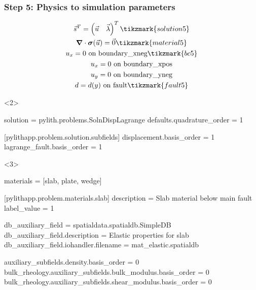 \documentclass[aspectratio=169]{beamer}
\begin{document}
\begin{frame}[t,fragile]
  \frametitle{Step 5: Physics to simulation parameters}
  \summary{}

  \begin{minipage}[t]{0.3\textwidth}
    {\scriptsize
    \begin{gather*}
    \vec{s}^T = \left( \vec{u} \quad \vec{\lambda} \right)^T \tikzmark{solution5}\\
    \tensor{\nabla} \cdot \tensor{\sigma}(\vec{u}) = \vec{0} \tikzmark{material5}\\
    u_x = 0 \text{ on boundary\_xneg} \tikzmark{bc5}\\
    u_x = 0 \text{ on boundary\_xpos} \\
    u_y = 0 \text{ on boundary\_yneg} \\
    d = d(y) \text{ on fault} \tikzmark{fault5}
    \end{gather*}}
  \end{minipage}
  \hfill
  \begin{minipage}[t]{0.67\textwidth}
    \begin{onlyenv}<2>
      \begin{cfgcode}
        solution = pylith.problems.SolnDispLagrange
        defaults.quadrature_order = 1
        
        [pylithapp.problem.solution.subfields]
        displacement.basis_order = 1
        lagrange_fault.basis_order = 1
      \end{cfgcode}
    \end{onlyenv}
    \begin{onlyenv}<3>
      \begin{cfgcode}
        materials = [slab, plate, wedge]

        [pylithapp.problem.materials.slab]
        description = Slab material below main fault
        label_value = 1

        db_auxiliary_field = spatialdata.spatialdb.SimpleDB
        db_auxiliary_field.description = Elastic properties for slab
        db_auxiliary_field.iohandler.filename = mat_elastic.spatialdb

        auxiliary_subfields.density.basis_order = 0
        bulk_rheology.auxiliary_subfields.bulk_modulus.basis_order = 0
        bulk_rheology.auxiliary_subfields.shear_modulus.basis_order = 0


\end{cfgcode}
\end{onlyenv}
\end{minipage}
\end{frame}
\end{document}
